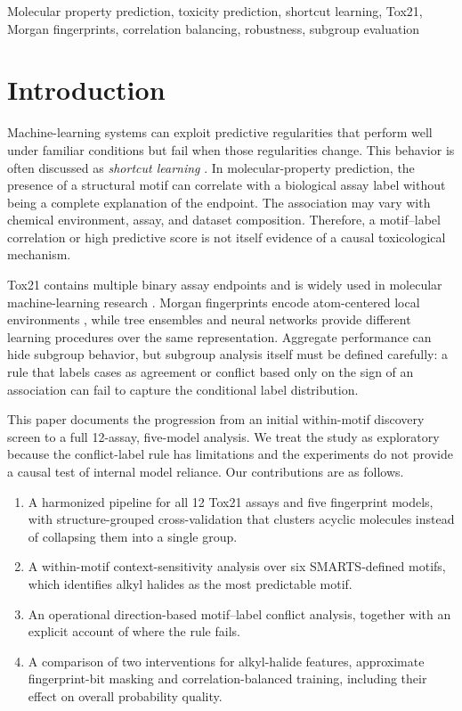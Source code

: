 \documentclass[conference]{IEEEtran}
\begin{document}
\begin{IEEEkeywords}
Molecular property prediction, toxicity prediction, shortcut learning, Tox21, Morgan fingerprints, correlation balancing, robustness, subgroup evaluation
\end{IEEEkeywords}

\section{Introduction}
Machine-learning systems can exploit predictive regularities that perform well under familiar conditions but fail when those regularities change. This behavior is often discussed as \emph{shortcut learning} \cite{geirhos2020}. In molecular-property prediction, the presence of a structural motif can correlate with a biological assay label without being a complete explanation of the endpoint. The association may vary with chemical environment, assay, and dataset composition. Therefore, a motif--label correlation or high predictive score is not itself evidence of a causal toxicological mechanism.

Tox21 contains multiple binary assay endpoints and is widely used in molecular machine-learning research \cite{richard2021,wu2018}. Morgan fingerprints encode atom-centered local environments \cite{rogers2010}, while tree ensembles and neural networks provide different learning procedures over the same representation. Aggregate performance can hide subgroup behavior, but subgroup analysis itself must be defined carefully: a rule that labels cases as agreement or conflict based only on the sign of an association can fail to capture the conditional label distribution.

This paper documents the progression from an initial within-motif discovery screen to a full 12-assay, five-model analysis. We treat the study as exploratory because the conflict-label rule has limitations and the experiments do not provide a causal test of internal model reliance. Our contributions are as follows.
\begin{enumerate}
\item A harmonized pipeline for all 12 Tox21 assays and five fingerprint models, with structure-grouped cross-validation that clusters acyclic molecules instead of collapsing them into a single group.
\item A within-motif context-sensitivity analysis over six SMARTS-defined motifs, which identifies alkyl halides as the most predictable motif.
\item An operational direction-based motif--label conflict analysis, together with an explicit account of where the rule fails.
\item A comparison of two interventions for alkyl-halide features, approximate fingerprint-bit masking and correlation-balanced training, including their effect on overall probability quality.
\end{enumerate}
\end{document}
